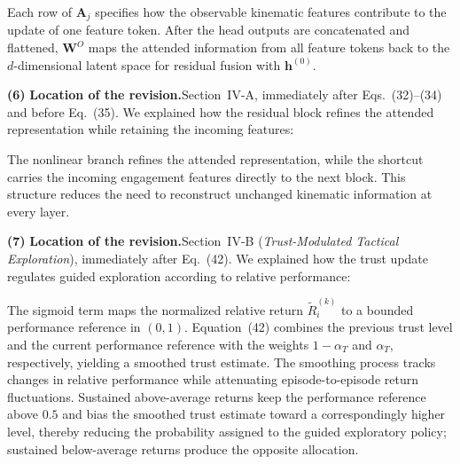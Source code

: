 \documentclass[11pt]{article}
\newcommand{\hladd}[1]{{\color{addblue}#1}}
\newcommand{\loc}{\medskip\noindent\textbf{Location of the revision.}\quad}
\begin{document}
\begin{tcolorbox}[enhanced,breakable,colback=white,colframe=addblue!55,
boxrule=0.6pt,arc=2pt,left=9pt,right=9pt,top=7pt,bottom=7pt]
\hladd{Each row of $\mathbf{A}_j$ specifies how the observable
kinematic features contribute to the update of one feature token. After the
head outputs are concatenated and flattened, $\mathbf{W}^{O}$ maps the
attended information from all feature tokens back to the $d$-dimensional
latent space for residual fusion with $\mathbf{h}^{(0)}$.}
\end{tcolorbox}

\medskip
\noindent\textbf{(6)}
\loc Section~IV-A, immediately after Eqs.~(32)--(34) and before Eq.~(35). 
We explained how the residual block refines the attended representation
while retaining the incoming features:

\begin{tcolorbox}[enhanced,breakable,colback=white,colframe=addblue!55,
coltext=addblue,fontupper=\color{addblue},boxrule=0.6pt,arc=2pt,
left=9pt,right=9pt,top=7pt,bottom=7pt]
\hladd{The nonlinear branch refines the attended representation, while
the shortcut carries the incoming engagement features directly to the next
block. This structure reduces the need to reconstruct unchanged kinematic
information at every layer.}
\end{tcolorbox}

\medskip
\noindent\textbf{(7)}
\loc Section~IV-B (\emph{Trust-Modulated Tactical Exploration}),
immediately after Eq.~(42). We explained how the trust update regulates
guided exploration according to relative performance:

\begin{tcolorbox}[enhanced,breakable,colback=white,colframe=addblue!55,
coltext=addblue,fontupper=\color{addblue},boxrule=0.6pt,arc=2pt,
left=9pt,right=9pt,top=7pt,bottom=7pt]
\hladd{The sigmoid term maps the normalized relative return
$\tilde{R}_i^{(k)}$ to a bounded performance reference in $(0,1)$.
Equation~(42) combines the previous trust level and
the current performance reference with the weights $1-\alpha_T$ and
$\alpha_T$, respectively, yielding a smoothed trust estimate. The
smoothing process tracks changes in relative performance while attenuating
episode-to-episode return fluctuations. Sustained above-average returns
keep the performance reference above $0.5$ and bias the smoothed trust
estimate toward a correspondingly higher level, thereby reducing the
probability assigned to the guided exploratory policy; sustained
below-average returns produce the opposite allocation.}
\end{tcolorbox}
\end{document}
